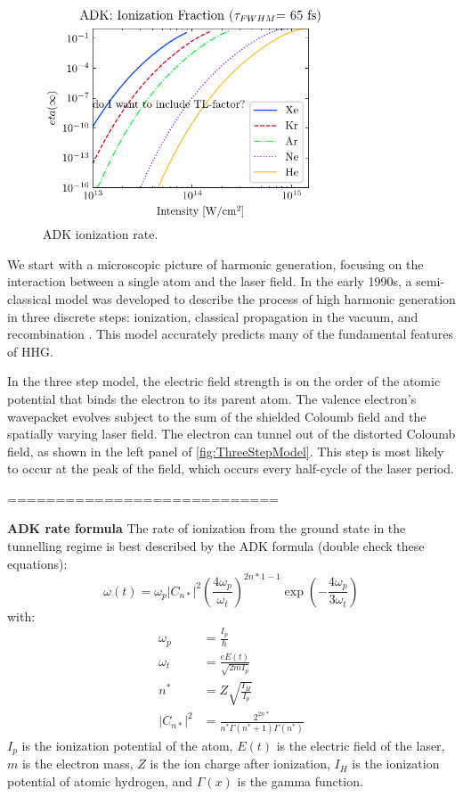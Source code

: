 \begin{figure}
	\centering
	\includegraphics[width=0.75\textwidth]{figures/chap1/ADK_ion_frac.pdf}
	\caption{ADK ionization rate.}
	\label{fig:ADK_ion_frac}
\end{figure}

We start with a microscopic picture of harmonic generation, focusing on the interaction between a single atom and the laser field. In the early 1990s, a semi-classical model was developed to describe the process of high harmonic generation in three discrete steps: ionization, classical propagation in the vacuum, and recombination \cite{schaferThresholdIonizationHigh1993,corkumPlasmaPerspectiveStrong1993}. This model accurately predicts many of the fundamental features of HHG.

In the three step model, the electric field strength is on the order of the atomic potential that binds the electron to its parent atom. The valence electron's wavepacket evolves subject to the sum of the shielded Coloumb field and the spatially varying laser field. The electron can tunnel out of the distorted Coloumb field, as shown in the left panel of \cref{fig:ThreeStepModel}. This step is most likely to occur at the peak of the field, which occurs every half-cycle of the laser period.


============================


\textbf{ADK rate formula}
The rate of ionization from the ground state in the tunnelling regime is best described by the ADK formula \cite{ammosovTunnelIonizationComplex1986} (double check these equations):
\begin{equation}
\omega(t) = \omega_p \left|C_{n*}\right|^2 \left(\frac{4 \omega_p}{\omega_t}\right)^{2 n*1-1} \exp \left(- \frac{4 \omega_p}{3 \omega_t}\right)
\end{equation}
with:
\begin{align}
\omega_p &= \frac{I_p}{\hbar} \\
\omega_t &= \frac{e E(t)}{\sqrt{2 m I_p}} \\
n^* &= Z \sqrt{\frac{I_H}{I_p}} \\
\left|C_{n*}\right|^2 &= \frac{2^{2n*}}{n^* \Gamma (n^*+1) \Gamma (n^*)}
\end{align}
$I_p$ is the ionization potential of the atom, $E(t)$ is the electric field of the laser, $m$ is the electron mass, $Z$ is the ion charge after ionization, $I_H$ is the ionization potential of atomic hydrogen, and $\Gamma(x)$ is the gamma function.

